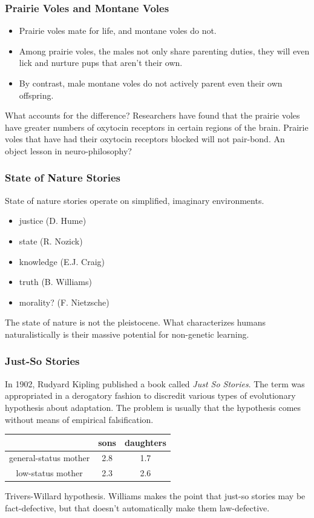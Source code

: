 \documentclass[xcolor=dvipsnames]{beamer}
\begin{document}
\begin{frame}
  \frametitle{Prairie Voles and Montane Voles}
  \begin{itemize}
  \item Prairie voles mate for life, and montane voles do not.
  \item Among prairie voles, the males not only share parenting
    duties, they will even lick and nurture pups that aren't their
    own.
  \item By contrast, male montane voles do not actively parent even
    their own offspring.
  \end{itemize}
  What accounts for the difference? Researchers have found that the
  prairie voles have greater numbers of oxytocin receptors in certain
  regions of the brain. Prairie voles that have had their oxytocin
  receptors blocked will not pair-bond. An object lesson in
  neuro-philosophy?
\end{frame}

\begin{frame}
  \frametitle{State of Nature Stories}
State of nature stories operate on simplified, imaginary environments.
  \begin{itemize}
  \item justice (D. Hume)
  \item state (R. Nozick)
  \item knowledge (E.J. Craig)
  \item truth (B. Williams)
  \item morality? (F. Nietzsche)
  \end{itemize}
  The state of nature is not the pleistocene. What characterizes
  humans naturalistically is their massive potential for non-genetic learning.
\end{frame}

\begin{frame}
  \frametitle{Just-So Stories}
  In 1902, Rudyard Kipling published a book called \emph{Just So
    Stories}. The term was appropriated in a derogatory fashion to
  discredit various types of evolutionary hypothesis about adaptation.
  The problem is usually that the hypothesis comes without means of
  empirical falsification.

  \bigskip

  \begin{tabular}{|c|c|c|}\hline
    & sons & daughters \\ \hline
    general-status mother & 2.8 & 1.7 \\ \hline
    low-status mother & 2.3 & 2.6 \\ \hline
  \end{tabular}

  \bigskip

  Trivers-Willard hypothesis. Williams makes the point that just-so
  stories may be fact-defective, but that doesn't automatically make
  them law-defective.
\end{frame}
\end{document}
